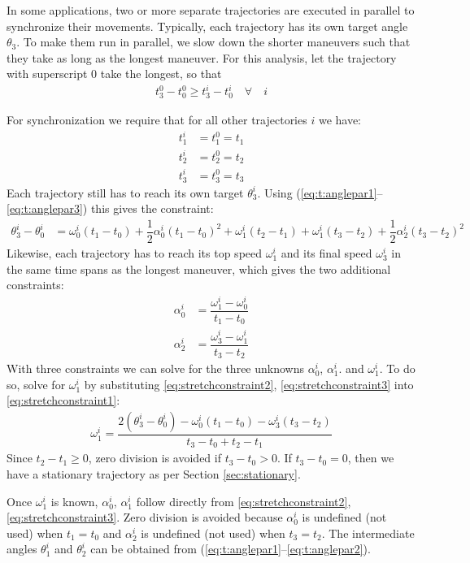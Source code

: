 \documentclass[12pt, a4paper]
{article}
\providecommand{\lr}[1]{\left(#1\right)}
\providecommand{\w}{\omega}
\renewcommand{\th}{\theta}
\renewcommand{\a}{\alpha}
\begin{document}
In some applications, two or more separate trajectories are executed in
parallel to synchronize their movements. Typically, each trajectory has its own
target angle $\th_3$. To make them run in parallel, we slow down the shorter
maneuvers such that they take as long as the longest maneuver. For this
analysis, let the trajectory with superscript $0$ take the longest, so that
%
\begin{align}
    t^0_3 - t^0_0 \geq t^i_3 - t^i_0  \quad \forall \quad i
\end{align}

For synchronization we require that for all other trajectories $i$ we have:
%
\begin{align}
    t^i_1 &= t^0_1=t_1\\[1em]
    t^i_2 &= t^0_2=t_2\\[1em]
    t^i_3 &= t^0_3=t_3
\end{align}
%
Each trajectory still has to reach its own target $\th^i_3$.
Using (\ref{eq:t:anglepar1}--\ref{eq:t:anglepar3}) this gives the constraint:
%
\begin{align}
    \label{eq:stretchconstraint1}
    \th^i_3 - \th^i_0  &=  \w^i_0(t_1-t_0)+\dfrac{1}{2}\a^i_0(t_1-t_0)^2+
        \w^i_1(t_2-t_1)+ \w^i_1(t_3-t_2)+\dfrac{1}{2}\a^i_2(t_3-t_2)^2    
\end{align}
%
Likewise, each trajectory has to reach its top speed $\w^i_1$ and its final
speed $\w^i_3$ in the same time spans as the longest maneuver, which gives the
two additional constraints:
%
\begin{align}
    \label{eq:stretchconstraint2}
    \a^i_0 &= \dfrac{\w^i_1-\w_0^i}{t_1 - t_0}\\[1em]
    \label{eq:stretchconstraint3}
    \a_2^i &= \dfrac{\w_3^i-\w_1^i}{t_3 - t_2}
\end{align}
%
With three constraints we can solve for the three unknowns $\a^i_0$, $\a^i_1$.
and $\w^i_1$. To do so, solve for $\w^i_1$ by substituting
\eqref{eq:stretchconstraint2}, \eqref{eq:stretchconstraint3} into
\eqref{eq:stretchconstraint1}:
%
\begin{align}
    \label{eq:stretchconstraintsolved}
    \w^i_1 = \dfrac{2\lr{\th_3^i-\th_0^i}-\w_0^i\lr{t_1-t_0} -
    \w_3^i\lr{t_3-t_2}}{t_3-t_0 + t_2 - t_1}
\end{align}
%
Since $t_2 - t_1 \geq 0$, zero division is avoided if $t_3 - t_0 > 0$. If $t_3
- t_0 = 0$, then we have a stationary trajectory as per Section
\ref{sec:stationary}.

Once $\w^i_1$ is known, $\a^i_0$, $\a^i_1$ follow directly from
\eqref{eq:stretchconstraint2}, \eqref{eq:stretchconstraint3}. Zero division is
avoided because $\a^i_0$ is undefined (not used) when $t_1 = t_0$ and $\a^i_2$
is undefined (not used) when $t_3 = t_2$. The intermediate angles $\th_1^i$
and $\th_2^i$ can be obtained from
(\ref{eq:t:anglepar1}--\ref{eq:t:anglepar2}).
\end{document}
